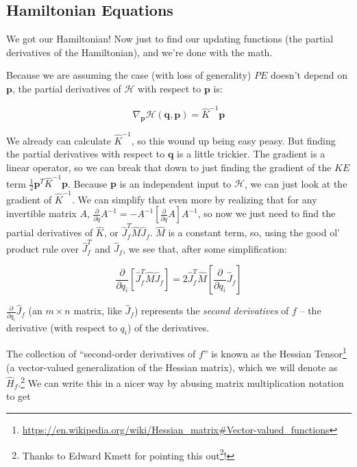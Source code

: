 \documentclass[]{article}
\renewcommand{\href}[2]{#2\footnote{\url{#1}}}
\begin{document}
\subsection{Hamiltonian Equations}\label{hamiltonian-equations}

We got our Hamiltonian! Now just to find our updating functions (the partial
derivatives of the Hamiltonian), and we're done with the math.

Because we are assuming the case (with loss of generality) \(PE\) doesn't depend
on \(\mathbf{p}\), the partial derivatives of \(\mathcal{H}\) with respect to
\(\mathbf{p}\) is:

\[
\nabla_{\mathbf{p}} \mathcal{H}(\mathbf{q},\mathbf{p}) = \hat{K}^{-1} \mathbf{p}
\]

We already can calculate \(\hat{K}^{-1}\), so this wound up being easy peasy.
But finding the partial derivatives with respect to \(\mathbf{q}\) is a little
trickier. The gradient is a linear operator, so we can break that down to just
finding the gradient of the \(KE\) term \(\frac{1}{2} \mathbf{p}^T \hat{K}^{-1}
\mathbf{p}\). Because \(\mathbf{p}\) is an independent input to \(\mathcal{H}\),
we can just look at the gradient of \(\hat{K}^{-1}\). We can simplify that even
more by realizing that for any invertible matrix \(A\),
\(\frac{\partial}{\partial
q} A^{-1} = - A^{-1} \left[ \frac{\partial}{\partial q} A \right] A^{-1}\), so
now we just need to find the partial derivatives of \(\hat{K}\), or
\(\hat{J}_f^T
\hat{M} \hat{J}_f\). \(\hat{M}\) is a constant term, so, using the good ol'
product rule over \(\hat{J}_f^T\) and \(\hat{J}_f\), we see that, after some
simplification:

\[
\frac{\partial}{\partial q_i} \left[ \hat{J}_f^T \hat{M} \hat{J}_f \right] =
    2 \hat{J}_f^T \hat{M} \left[ \frac{\partial}{\partial q_i} \hat{J}_f \right]
\]

\(\frac{\partial}{\partial q_i} \hat{J}_f\) (an \(m \times n\) matrix, like
\(\hat{J}_f\)) represents the \emph{second derivatives} of \(f\) -- the
derivative (with respect to \(q_i\)) of the derivatives.

The collection of ``second-order derivatives of \(f\)'' is known as the
\href{https://en.wikipedia.org/wiki/Hessian_matrix\#Vector-valued_functions}{Hessian
Tensor} (a vector-valued generalization of the Hessian matrix), which we will
denote as \(\hat{H}_f\).\footnote{Thanks to Edward Kmett for
  \href{http://disq.us/p/1o4oyqh}{pointing this out}!} We can write this in a
nicer way by abusing matrix multiplication notation to get
\end{document}
